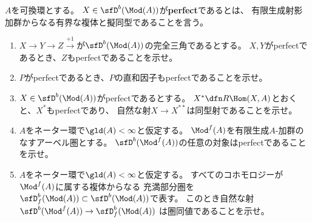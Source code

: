 \documentclass[uplatex,dvipdfmx]{jsarticle}
\begin{document}
\maketitle\HeaderCommentA
\section{}
\fi


\begin{prob}\label{1.30}
  \(A\)を可換環とする。
  \(X\in \sfD^b(\Mod(A))\)が\textbf{perfect}であるとは、
  有限生成射影加群からなる有界な複体と擬同型であることを言う。
  \begin{enumerate}
    \item \label{1.30.1}
    \(X\to Y\to Z\xrightarrow{+1}\)が\(\sfD^b(\Mod(A))\)の完全三角であるとする。
    \(X,Y\)がperfectであるとき、\(Z\)もperfectであることを示せ。
    \item \label{1.30.2}
    \(P\)がperfectであるとき、\(P\)の直和因子もperfectであることを示せ。
    \item \label{1.30.3}
    \(X\in \sfD^b(\Mod(A))\)がperfectであるとする。
    \(X^*\dfn R\Hom(X,A)\)とおくと、\(X^*\)もperfectであり、
    自然な射\(X\to X^{**}\)は同型射であることを示せ。
    \item \label{1.30.4}
    \(A\)をネーター環で\(\gld(A) < \infty\)と仮定する。
    \(\Mod^f(A)\)を有限生成\(A\)-加群のなすアーベル圏とする。
    \(\sfD^b(\Mod^f(A))\)の任意の対象はperfectであることを示せ。
    \item \label{1.30.5}
    \(A\)をネーター環で\(\gld(A) < \infty\)と仮定する。
    すべてのコホモロジーが\(\Mod^f(A)\)に属する複体からなる
    充満部分圏を\(\sfD^b_f(\Mod(A))\subset \sfD^b(\Mod(A))\)で表す。
    このとき自然な射\(\sfD^b(\Mod^f(A)) \to \sfD^b_f(\Mod(A))\)
    は圏同値であることを示せ。
  \end{enumerate}
\end{prob}
\end{document}
